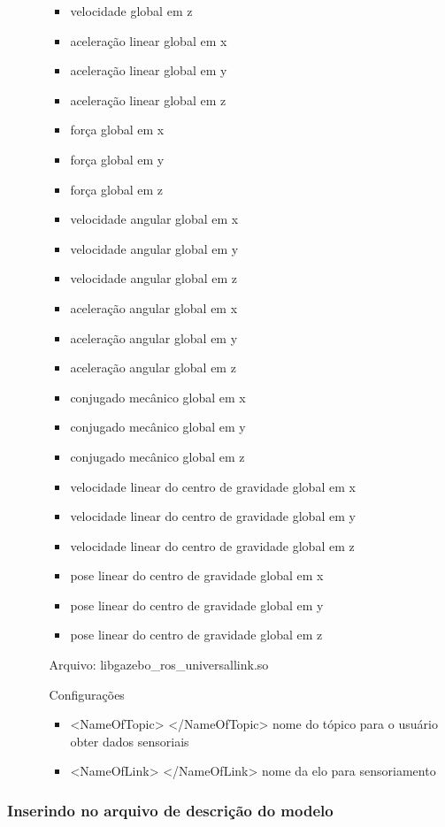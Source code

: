 \begin{itemize}
\begin{itemize}
\begin{itemize}
\item velocidade global em z
\item aceleração linear global em x
\item aceleração linear global em y
\item aceleração linear global em z
\item força global em x
\item força global em y
\item força global em z
\item velocidade angular global em x
\item velocidade angular global em y
\item velocidade angular global em z
\item aceleração angular global em x
\item aceleração angular global em y
\item aceleração angular global em z
\item conjugado mecânico global em x
\item conjugado mecânico global em y
\item conjugado mecânico global em z
\item velocidade linear do centro de gravidade global em x
\item velocidade linear do centro de gravidade global em y
\item velocidade linear do centro de gravidade global em z
\item pose linear do centro de gravidade global em x
\item pose linear do centro de gravidade global em y
\item pose linear do centro de gravidade global em z
\end{itemize}

\item[Arquivo:] libgazebo\_ros\_universallink.so
\item[Configurações]
\begin{itemize}
\item <NameOfTopic> </NameOfTopic> nome do tópico para o usuário obter dados sensoriais
\item <NameOfLink> </NameOfLink> nome da elo para sensoriamento
\end{itemize}
\end{itemize}
\end{itemize}

\subsubsection{Inserindo no arquivo de descrição do modelo}

